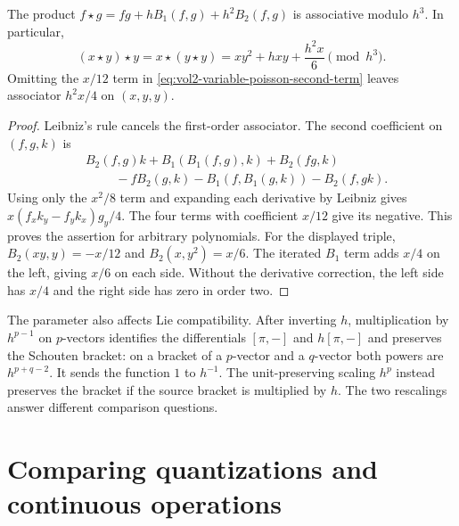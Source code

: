 \begin{proposition}\label{prop:vol2-variable-poisson-associator}
The product $f\star g=fg+hB_1(f,g)+h^2B_2(f,g)$
is associative modulo $h^3$.
In particular,
\[
 (x\star y)\star y=x\star(y\star y)
   =xy^2+hxy+\frac{h^2x}{6}\pmod{h^3}.
\]
Omitting the $x/12$ term in
\eqref{eq:vol2-variable-poisson-second-term}
leaves associator $h^2x/4$ on $(x,y,y)$.
\end{proposition}
\begin{proof}
Leibniz's rule cancels the first-order associator.
The second coefficient on $(f,g,k)$ is
\[
 \begin{split}
 &B_2(f,g)k+B_1(B_1(f,g),k)+B_2(fg,k)\\
 &\hspace{1cm}
   -fB_2(g,k)-B_1(f,B_1(g,k))-B_2(f,gk).
 \end{split}
\]
Using only the $x^2/8$ term and expanding each
derivative by Leibniz gives
$x(f_xk_y-f_yk_x)g_y/4$.
The four terms with coefficient $x/12$ give its
negative. This proves the assertion for arbitrary
polynomials.
For the displayed triple,
$B_2(xy,y)=-x/12$ and $B_2(x,y^2)=x/6$.
The iterated $B_1$ term adds $x/4$ on the left,
giving $x/6$ on each side.
Without the derivative correction, the left side
has $x/4$ and the right side has zero in order two.
\end{proof}

The parameter also affects Lie compatibility.
After inverting $h$, multiplication by $h^{p-1}$
on $p$-vectors identifies the differentials
$[\pi,-]$ and $h[\pi,-]$ and preserves the
Schouten bracket: on a bracket of a $p$-vector and
a $q$-vector both powers are $h^{p+q-2}$.
It sends the function $1$ to $h^{-1}$.
The unit-preserving scaling $h^p$ instead preserves
the bracket if the source bracket is multiplied
by $h$. The two rescalings answer different
comparison questions.

\section{Comparing quantizations and continuous operations}
\label{sec:vol2-continuous-wheel-comparison}

